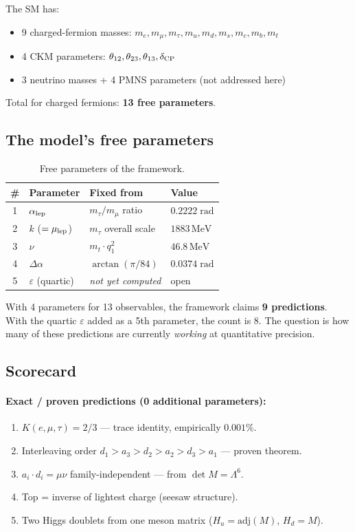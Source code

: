 \documentclass[12pt,a4paper]{article}
\newcommand{\adj}{\mathrm{adj}}
\newcommand{\MeV}{\,\mathrm{MeV}}
\begin{document}
The SM has:
\begin{itemize}
\item 9 charged-fermion masses: $m_e, m_\mu, m_\tau, m_u, m_d, m_s, m_c, m_b, m_t$
\item 4 CKM parameters: $\theta_{12}, \theta_{23}, \theta_{13}, \delta_{\rm CP}$
\item 3 neutrino masses + 4 PMNS parameters (not addressed here)
\end{itemize}
Total for charged fermions: \textbf{13 free parameters}.

\subsection{The model's free parameters}

\begin{table}[h]
\centering
\caption{Free parameters of the framework.}
\label{tab:params}
\begin{tabular}{clll}
  \toprule
  \# & Parameter & Fixed from & Value \\
  \midrule
  1 & $\alpha_{\rm lep}$ & $m_\tau/m_\mu$ ratio & $0.2222\;\mathrm{rad}$ \\
  2 & $k$ ($= \mu_{\rm lep}$) & $m_\tau$ overall scale & $1883\MeV$ \\
  3 & $\nu$ & $m_t \cdot q_1^2$ & $46.8\MeV$ \\
  4 & $\Delta\alpha$ & $\arctan(\pi/84)$ & $0.0374\;\mathrm{rad}$ \\
  \midrule
  5 & $\varepsilon$ (quartic) & \textit{not yet computed} & open \\
  \bottomrule
\end{tabular}
\end{table}

\noindent With 4 parameters for 13 observables, the framework claims
\textbf{9 predictions}.  With the quartic $\varepsilon$ added as a 5th
parameter, the count is 8.  The question is how many of these predictions
are currently \emph{working} at quantitative precision.

\subsection{Scorecard}

\paragraph{Exact / proven predictions (0 additional parameters):}
\begin{enumerate}
\item $K(e, \mu, \tau) = 2/3$ --- trace identity, empirically $0.001\%$.
\item Interleaving order $d_1 > a_3 > d_2 > a_2 > d_3 > a_1$ --- proven theorem.
\item $a_i \cdot d_i = \mu\nu$ family-independent --- from $\det M = \Lambda^6$.
\item Top = inverse of lightest charge (seesaw structure).
\item Two Higgs doublets from one meson matrix ($H_u = \adj(M)$, $H_d = M$).
\end{enumerate}
\end{document}
